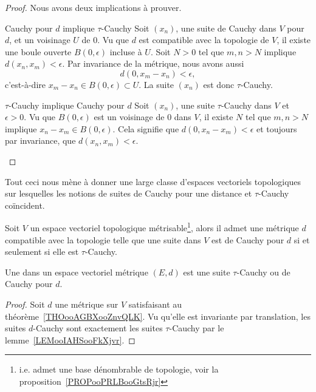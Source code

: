 \begin{proof}
    Nous avons deux implications à prouver. 
    \begin{subproof}
    \item[Cauchy pour \( d\) implique \( \tau\)-Cauchy]
        Soit \( (x_n)\), une suite de Cauchy dans \( V\) pour \( d\), et un voisinage \( U\) de \( 0\). Vu que \( d\) est compatible avec la topologie de \( V\), il existe une boule ouverte \( B(0,\epsilon)\) incluse à \( U\). Soit \( N>0\) tel que \( m,n>N\) implique \( d(x_n,x_m)<\epsilon\). Par invariance de la métrique, nous avons aussi
        \begin{equation}
            d(0,x_m-x_n)<\epsilon,
        \end{equation}
        c'est-à-dire \( x_m-x_n\in B(0,\epsilon)\subset U\). La suite \( (x_n)\) est donc \( \tau\)-Cauchy.
    \item[\( \tau\)-Cauchy implique Cauchy pour \( d\)]
        Soit $(x_n)$, une suite \( \tau\)-Cauchy dans \( V\) et \( \epsilon>0\). Vu que \( B(0,\epsilon)\) est un voisinage de \( 0\) dans \( V\), il existe \( N\) tel que \( m,n>N\) implique \( x_n-x_m\in B(0,\epsilon)\). Cela signifie que \( d(0,x_n-x_m)<\epsilon\) et toujours par invariance, que \( d(x_n,x_m)<\epsilon\).
    \end{subproof}
\end{proof}

Tout ceci nous mène à donner une large classe d'espaces vectoriels topologiques sur lesquelles les notions de suites de Cauchy pour une distance et \( \tau\)-Cauchy coïncident.

\begin{theoremDef}     \label{THOooGQZSooAmQolf}
    Soit \( V\) un espace vectoriel topologique métrisable\footnote{i.e. admet une base dénombrable de topologie, voir la proposition~\ref{PROPooPRLBooGtsRjr}}, alors il admet une métrique \( d\) compatible avec la topologie telle que une suite dans \( V\) est de Cauchy pour \( d\) si et seulement si elle est \( \tau\)-Cauchy.

    Une  dans un espace vectoriel métrique \( (E,d)\) est une suite \( \tau\)-Cauchy ou de Cauchy pour \( d \).
\end{theoremDef}

\begin{proof}
    Soit \( d\) une métrique sur \( V\) satisfaisant au théorème~\ref{THOooAGBXooZnvQLK}. Vu qu'elle est invariante par translation, les suites \( d\)-Cauchy sont exactement les suites \( \tau\)-Cauchy par le lemme~\ref{LEMooIAHSooFkXjvr}.
\end{proof}

